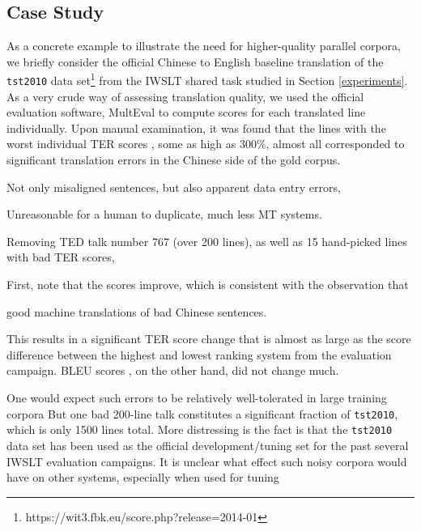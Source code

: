 \subsection{Case Study}
\label{case_study}

As a concrete example to illustrate the need for higher-quality parallel corpora, we briefly consider the official Chinese to English baseline translation of the {\small \tt tst2010} data set\footnote{https://wit3.fbk.eu/score.php?release=2014-01} from the IWSLT shared task studied in Section \ref{experiments}.
As a very crude way of assessing translation quality, we used the official evaluation software, MultEval  to compute scores for each translated line individually.
Upon manual examination, it was found that the lines with the worst individual TER scores , some as high as 300\%, almost all corresponded to significant translation errors in the Chinese side of the gold corpus.

Not only misaligned sentences, but also apparent data entry errors, 

Unreasonable for a human to duplicate, much less MT systems.

Removing TED talk number 767 (over 200 lines), as well as 15 hand-picked lines with bad TER scores, 

First, note that the scores improve, which is consistent with the observation that 

good machine translations of bad Chinese sentences.


This results in a significant TER score change that is almost as large as the score difference between the highest and lowest ranking system from the evaluation campaign.  
BLEU scores , on the other hand, did not change much.



One would expect such errors to be relatively well-tolerated in large training corpora
But one bad 200-line talk constitutes a significant fraction of {\small \tt tst2010}, which is only 1500 lines total.
More distressing is the fact is that the {\small \tt tst2010} data set has been used as the official development/tuning set for the past several IWSLT evaluation campaigns.
It is unclear what effect such noisy corpora would have on other systems, 
especially when used for tuning






